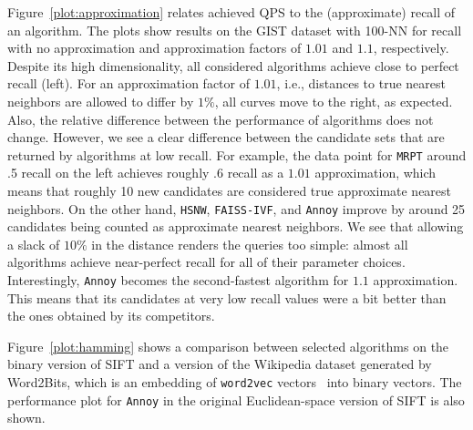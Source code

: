 \begin{figure}[t!]


\end{figure}

\begin{figure}[t!]

\end{figure}
\begin{figure}[t!]

\end{figure}

 Figure~\ref{plot:approximation} relates achieved QPS to the (approximate) recall of an algorithm. The plots show 
results on the \textsf{GIST} dataset with 100-NN for recall with no
approximation and approximation factors of $1.01$ and $1.1$, respectively. Despite its high
dimensionality, all considered algorithms achieve close to perfect recall (left). For an
approximation factor of $1.01$, i.e., distances to true nearest neighbors are allowed to differ by $1\%$, all curves move to the right, as expected. Also, the relative difference between the performance of algorithms does not change. However, we see a clear difference between the candidate sets that are returned by algorithms at low recall. For example, the data point for \texttt{MRPT} around .5 recall on the left achieves roughly .6 recall
as a $1.01$ approximation, which means that roughly 10 new candidates are considered true approximate nearest neighbors. On the other hand, \texttt{HSNW}, \texttt{FAISS-IVF}, and \texttt{Annoy} improve by around 25 candidates being counted as approximate nearest neighbors. We see that allowing a slack of $10\%$ in the distance renders the queries too simple: almost all algorithms achieve near-perfect recall for all of their parameter choices. Interestingly, \texttt{Annoy} becomes the
second-fastest algorithm for $1.1$ approximation. This means that its candidates at very low recall values were a bit better than the ones obtained by its competitors. 




 Figure~\ref{plot:hamming} shows a comparison between selected algorithms on the binary version of \textsf{SIFT} and a version of the Wikipedia dataset generated by \textsf{Word2Bits}, which is an embedding of \texttt{word2vec} vectors~\cite{Mikolov13} into binary vectors. The
performance plot for \texttt{Annoy} in the original Euclidean-space
version of \textsf{SIFT} is also shown. 

